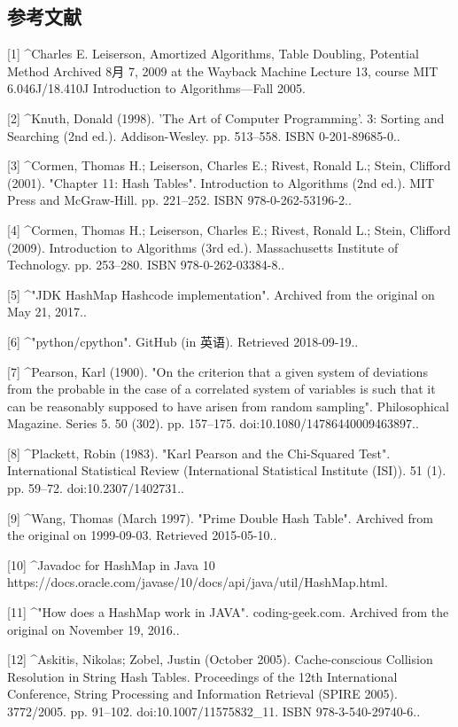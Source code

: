 \subsection{参考文献}
[1]
^Charles E. Leiserson, Amortized Algorithms, Table Doubling, Potential Method Archived 8月 7, 2009 at the Wayback Machine Lecture 13, course MIT 6.046J/18.410J Introduction to Algorithms—Fall 2005.

[2]
^Knuth, Donald (1998). 'The Art of Computer Programming'. 3: Sorting and Searching (2nd ed.). Addison-Wesley. pp. 513–558. ISBN 0-201-89685-0..

[3]
^Cormen, Thomas H.; Leiserson, Charles E.; Rivest, Ronald L.; Stein, Clifford (2001). "Chapter 11: Hash Tables". Introduction to Algorithms (2nd ed.). MIT Press and McGraw-Hill. pp. 221–252. ISBN 978-0-262-53196-2..

[4]
^Cormen, Thomas H.; Leiserson, Charles E.; Rivest, Ronald L.; Stein, Clifford (2009). Introduction to Algorithms (3rd ed.). Massachusetts Institute of Technology. pp. 253–280. ISBN 978-0-262-03384-8..

[5]
^"JDK HashMap Hashcode implementation". Archived from the original on May 21, 2017..

[6]
^"python/cpython". GitHub (in 英语). Retrieved 2018-09-19..

[7]
^Pearson, Karl (1900). "On the criterion that a given system of deviations from the probable in the case of a correlated system of variables is such that it can be reasonably supposed to have arisen from random sampling". Philosophical Magazine. Series 5. 50 (302). pp. 157–175. doi:10.1080/14786440009463897..

[8]
^Plackett, Robin (1983). "Karl Pearson and the Chi-Squared Test". International Statistical Review (International Statistical Institute (ISI)). 51 (1). pp. 59–72. doi:10.2307/1402731..

[9]
^Wang, Thomas (March 1997). "Prime Double Hash Table". Archived from the original on 1999-09-03. Retrieved 2015-05-10..

[10]
^Javadoc for HashMap in Java 10 https://docs.oracle.com/javase/10/docs/api/java/util/HashMap.html.

[11]
^"How does a HashMap work in JAVA". coding-geek.com. Archived from the original on November 19, 2016..

[12]
^Askitis, Nikolas; Zobel, Justin (October 2005). Cache-conscious Collision Resolution in String Hash Tables. Proceedings of the 12th International Conference, String Processing and Information Retrieval (SPIRE 2005). 3772/2005. pp. 91–102. doi:10.1007/11575832_11. ISBN 978-3-540-29740-6..

